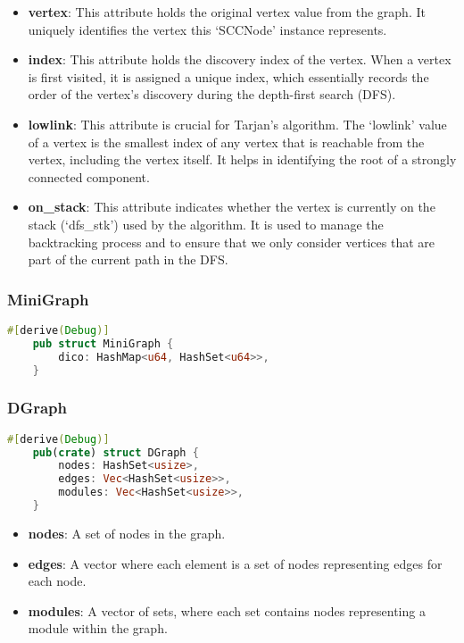\begin{itemize}
    \item \textbf{vertex}: This attribute holds the original vertex value from the graph.
    It uniquely identifies the vertex this `SCCNode' instance represents.
    \item \textbf{index}: This attribute holds the discovery index of the vertex.
    When a vertex is first visited, it is assigned a unique index, which essentially records the order of the vertex's discovery during the depth-first search (DFS).
    \item \textbf{lowlink}: This attribute is crucial for Tarjan's algorithm.
    The `lowlink' value of a vertex is the smallest index of any vertex that is reachable from the vertex, including the vertex itself.
    It helps in identifying the root of a strongly connected component.
    \item \textbf{on\_stack}: This attribute indicates whether the vertex is currently on the stack (`dfs\_stk') used by the algorithm.
    It is used to manage the backtracking process and to ensure that we only consider vertices that are part of the current path in the DFS\@.
\end{itemize}


\subsubsection{MiniGraph}

\begin{lstlisting}[language=Rust, style=rust, caption={Defining the Minigraph with Rust}, label={lst:rust-define-minigraph}, firstnumber=1]
    #[derive(Debug)]
    pub struct MiniGraph {
        dico: HashMap<u64, HashSet<u64>>,
    }
\end{lstlisting}

\subsubsection{DGraph}

\begin{lstlisting}[language=Rust, style=rust, caption={Defining the DGraph with Rust}, label={lst:rust-define-dgraph}, firstnumber=1]
    #[derive(Debug)]
    pub(crate) struct DGraph {
        nodes: HashSet<usize>,
        edges: Vec<HashSet<usize>>,
        modules: Vec<HashSet<usize>>,
    }
\end{lstlisting}

\begin{itemize}
    \item \textbf{nodes}: A set of nodes in the graph.
    \item \textbf{edges}: A vector where each element is a set of nodes representing edges for each node.
    \item \textbf{modules}: A vector of sets, where each set contains nodes representing a module within the graph.
\end{itemize}

